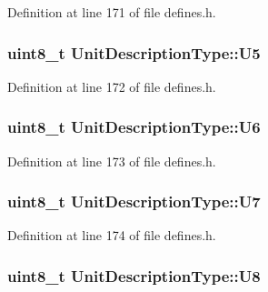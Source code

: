 Definition at line 171 of file defines.\+h.

\subsubsection[{\texorpdfstring{U5}{U5}}]{\setlength{\rightskip}{0pt plus 5cm}uint8\+\_\+t Unit\+Description\+Type\+::\+U5}\hypertarget{structUnitDescriptionType_ab11845623074981c46cbe7af4a5964cd}{}\label{structUnitDescriptionType_ab11845623074981c46cbe7af4a5964cd}


Definition at line 172 of file defines.\+h.

\subsubsection[{\texorpdfstring{U6}{U6}}]{\setlength{\rightskip}{0pt plus 5cm}uint8\+\_\+t Unit\+Description\+Type\+::\+U6}\hypertarget{structUnitDescriptionType_a8c7c9b56c879d736a289183fcee17b84}{}\label{structUnitDescriptionType_a8c7c9b56c879d736a289183fcee17b84}


Definition at line 173 of file defines.\+h.

\subsubsection[{\texorpdfstring{U7}{U7}}]{\setlength{\rightskip}{0pt plus 5cm}uint8\+\_\+t Unit\+Description\+Type\+::\+U7}\hypertarget{structUnitDescriptionType_a9b90dfa70ea1e381a0ea6032ca804ad6}{}\label{structUnitDescriptionType_a9b90dfa70ea1e381a0ea6032ca804ad6}


Definition at line 174 of file defines.\+h.

\subsubsection[{\texorpdfstring{U8}{U8}}]{\setlength{\rightskip}{0pt plus 5cm}uint8\+\_\+t Unit\+Description\+Type\+::\+U8}\hypertarget{structUnitDescriptionType_adea079c655e18cac88ad05a8243f22f8}{}\label{structUnitDescriptionType_adea079c655e18cac88ad05a8243f22f8}


